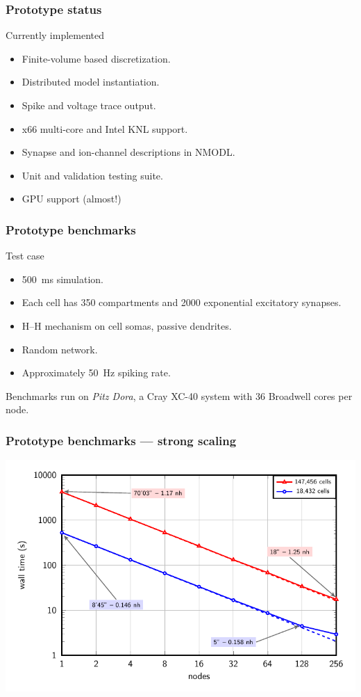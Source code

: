 \documentclass[aspectratio=43,12pt]{beamer}
\newcommand{\subheading}[1]{{\large #1}}
\begin{document}
\begin{frame}
\frametitle{Prototype status}

\subheading{Currently implemented}

\vfill
\begin{itemize}
\item Finite-volume based discretization.
\item Distributed model instantiation.
\item Spike and voltage trace output.
\item x66 multi-core and Intel KNL support.
\item Synapse and ion-channel descriptions in NMODL.
\item Unit and validation testing suite.
\item GPU support (almost!)
\end{itemize}

\vfill
\vspace{4ex}
\end{frame}

\begin{frame}
\frametitle{Prototype benchmarks}
\subheading{Test case}

\vfill
\begin{itemize}
\item 500~ms simulation.
\item Each cell has 350 compartments and 2000 exponential excitatory synapses.
\item H--H mechanism on cell somas, passive dendrites.
\item Random network.
\item Approximately 50~Hz spiking rate.
\end{itemize}

\vfill
Benchmarks run on \emph{Pitz Dora}, a Cray XC-40 system with 36 Broadwell cores per node.

\vfill
\end{frame}

\begin{frame}
\frametitle{Prototype benchmarks --- strong scaling}
\includegraphics[width=\textwidth]{strong.pdf}

\vfill
\end{frame}
\end{document}
